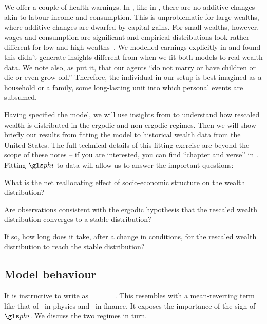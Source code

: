 We offer a couple of health warnings. In \RGBM, like in \GBM, there are no additive changes akin to labour income and consumption. This is unproblematic for large wealths, where additive changes are dwarfed by capital gains. For small wealths, however, wages and consumption are significant and empirical distributions look rather different for low and high wealths~\cite{DragulescuYakovenko2001}. We modelled earnings explicitly in \cite{BermanPetersAdamou2019} and found this didn't generate insights different from \RGBM when we fit both models to real wealth data. We note also, as \cite[p.~41]{Meade1964} put it, that our agents ``do not marry or have children or die or even grow old.'' Therefore, the individual in our setup is best imagined as a household or a family, \ie some long-lasting unit into which personal events are subsumed.

Having specified the model, we will use insights from  to understand how rescaled wealth is distributed in the ergodic and non-ergodic regimes. Then we will show briefly our results from fitting the model to historical wealth data from the United States. The full technical details of this fitting exercise are beyond the scope of these notes -- if you are interested, you can find ``chapter and verse'' in \cite{BermanPetersAdamou2019}. Fitting $\gphi$ to data will allow us to answer the important questions:
\bi
\item
What is the net reallocating effect of socio-economic structure on the wealth distribution?
\item
Are observations consistent with the ergodic hypothesis that the rescaled wealth distribution converges to a stable distribution?
\item
If so, how long does it take, after a change in conditions, for the rescaled wealth distribution to reach the stable distribution?
\ei


\subsection{Model behaviour}
It is instructive to write  as
\be
\gd\x_\gi=\underbrace{\x_\gi \left[\gmu \gd\t+\gsigma \gd\gW_\gi\left(\t\right)\right]}_{} \;\; \underbrace{ - \;\; \gphi (\x_\gi-\ave{\x}_\N) \gd\t}_{}.
\ee
This resembles \GBM with a mean-reverting term like that of~\cite{UhlenbeckOrnstein1930} in physics and~\cite{Vasicek1977} in finance. It exposes the importance of the sign of $\gphi$. We discuss the two regimes in turn.

